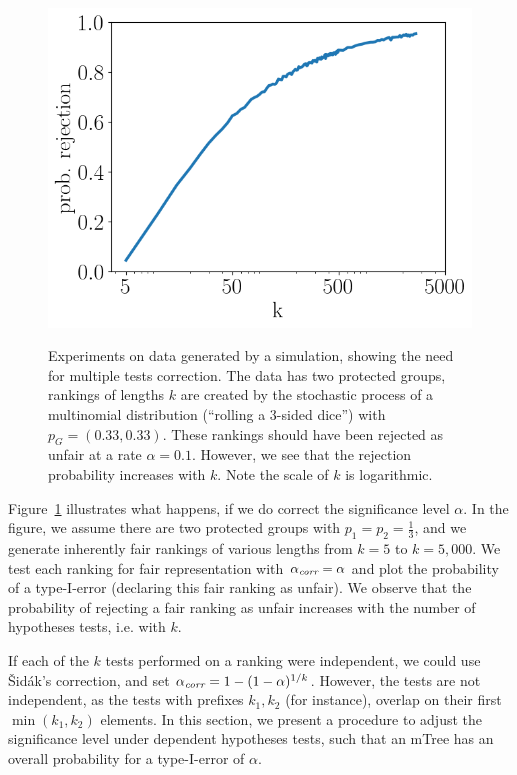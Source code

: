 \begin{figure}[t!]
	\centering
	{\includegraphics[width=.48\textwidth]{pics/failProbPlotMultinom.png}}
	\CaptionMargin
	\caption{Experiments on data generated by a simulation, showing the need for multiple tests correction.
		The data has two protected groups, rankings of lengths $k$ are created by the stochastic process of a multinomial distribution (``rolling a 3-sided dice'') with $p_G = (0.33, 0.33)$.
		These rankings should have been rejected as unfair at a rate $\alpha = 0.1$.
		However, we see that the rejection probability increases with $k$.
		Note the scale of $k$ is logarithmic.}
	\label{fig:why-adjustment-is-needed-multinomial}
\end{figure}

Figure~\ref{fig:why-adjustment-is-needed-multinomial} illustrates what happens, if we do correct the significance level $\alpha$.
%
In the figure, we assume there are two protected groups with $p_1=p_2=\frac{1}{3}$, and we generate inherently fair rankings of various lengths from $k=5$ to $k=5,000$.
%
We test each ranking for fair representation with $\alpha_\textit{corr} = \alpha$ and plot the probability of a type-I-error (declaring this fair ranking as unfair).
%
We observe that the probability of rejecting a fair ranking as unfair increases with the number of hypotheses tests, i.e. with $k$.

If each of the $k$ tests performed on a ranking were independent, we could use {\v S}id{\'a}k's correction, and set $\alpha_\textit{corr} = 1 - (1 - \alpha)^{1/k}$.
%
However, the tests are not independent, as the tests with prefixes $k_1, k_2$ (for instance), overlap on their first $\min(k_1, k_2)$ elements.
%
In this section, we present a procedure to adjust the significance level under dependent hypotheses tests, such that an mTree has an overall probability for a type-I-error of $\alpha$.


